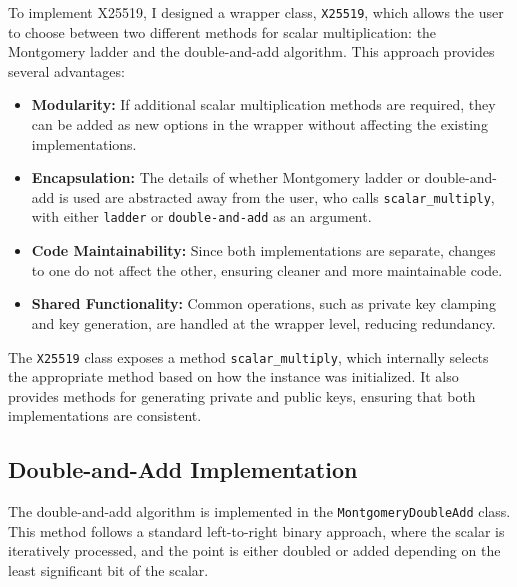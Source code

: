 \documentclass[twoside,a4paper,12pt]{article}
\begin{document}
To implement X25519, I designed a wrapper class, \texttt{X25519}, which allows the user to choose between two different methods for scalar multiplication: the Montgomery ladder and the double-and-add algorithm. This approach provides several advantages:
\begin{itemize}
    \item \textbf{Modularity:} If additional scalar multiplication methods are required, they can be added as new options in the wrapper without affecting the existing implementations.
    \item \textbf{Encapsulation:} The details of whether Montgomery ladder or double-and-add is used are abstracted away from the user, who calls \texttt{scalar\_multiply}, with either \texttt{ladder} or \texttt{double-and-add} as an argument.
    \item \textbf{Code Maintainability:} Since both implementations are separate, changes to one do not affect the other, ensuring cleaner and more maintainable code.
    \item \textbf{Shared Functionality:} Common operations, such as private key clamping and key generation, are handled at the wrapper level, reducing redundancy.
\end{itemize}

The \texttt{X25519} class exposes a method \texttt{scalar\_multiply}, which internally selects the appropriate method based on how the instance was initialized. It also provides methods for generating private and public keys, ensuring that both implementations are consistent.

\subsection{Double-and-Add Implementation}
\label{subsec:x25519_double_add}

The double-and-add algorithm is implemented in the \texttt{MontgomeryDoubleAdd} class. This method follows a standard left-to-right binary approach, where the scalar is iteratively processed, and the point is either doubled or added depending on the least significant bit of the scalar.
\end{document}

